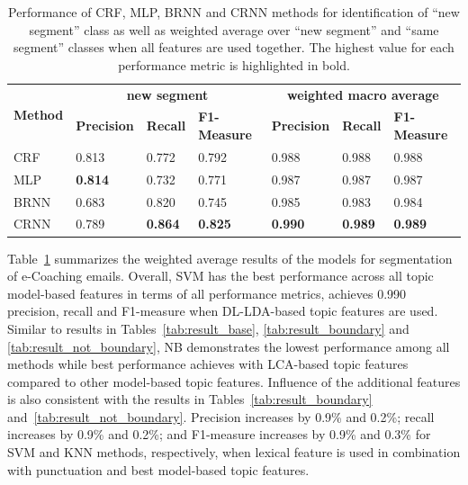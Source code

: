 \documentclass{amia}
\begin{document}
\begin{table}[ht]
\centering
\caption{Performance of CRF, MLP, BRNN and CRNN methods for identification of ``new segment'' class as well as weighted average over ``new segment'' and ``same segment'' classes when all features are used together. The highest value for each performance metric
is highlighted in bold.}
\label{tab:result_weighted_avg}
 \begin{tabular}{|l|l|l|l|l|l|l|}
  \hline
   \multirow{2}{*}{\textbf{Method}} & \multicolumn{3}{|c|}{\textbf{new segment}} & \multicolumn{3}{|c|}{\textbf{weighted macro average}} \\\cline{2-7}
   & \textbf{Precision}  & \textbf{Recall} & \textbf{F1-Measure} & \textbf{Precision}  & \textbf{Recall} & \textbf{F1-Measure} \\ \hline    
 CRF & 0.813 & 0.772 & 0.792 & 0.988 & 0.988 & 0.988 \\ \hline
 MLP & \textbf{0.814} & 0.732 & 0.771 & 0.987 & 0.987 & 0.987 \\ \hline
 BRNN & 0.683 & 0.820 & 0.745 & 0.985 & 0.983 & 0.984 \\ \hline
 CRNN & 0.789 & \textbf{0.864} & \textbf{0.825} & \textbf{0.990} & \textbf{0.989} & \textbf{0.989} \\ \hline
  \end{tabular}
\end{table}              

Table~\ref{tab:result_weighted_avg} summarizes the weighted average results of the models for segmentation of e-Coaching emails. Overall, SVM has the best performance across all topic model-based features in terms of all performance metrics, achieves 0.990 precision, recall and F1-measure when DL-LDA-based topic features are used. Similar to results in Tables~\ref{tab:result_base}, \ref{tab:result_boundary} and \ref{tab:result_not_boundary}, NB demonstrates the lowest performance among all methods while best performance achieves with LCA-based topic features compared to other model-based topic features. Influence of the additional features is also consistent with the results in Tables~\ref{tab:result_boundary} and~\ref{tab:result_not_boundary}. Precision increases by 0.9\% and 0.2\%; recall increases by 0.9\% and 0.2\%; and F1-measure increases by 0.9\% and 0.3\% for SVM and KNN methods, respectively, when lexical feature is used in combination with punctuation and best model-based topic features.
\end{document}
